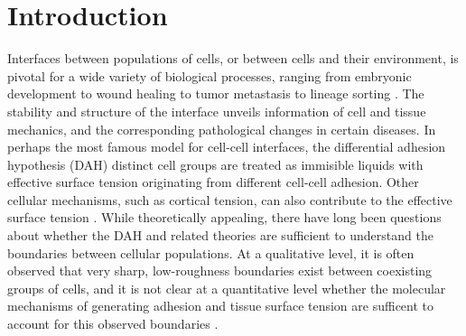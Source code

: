 \documentclass[twoside,twocolumn,9pt]{article}
\begin{document}




\section{Introduction}
Interfaces between populations of cells, or between cells and their environment, is pivotal for a wide variety of biological processes, ranging from embryonic development to wound healing to  tumor metastasis to lineage sorting \cite{dahmann2011boundary, yang2020leader, pawlizak2015testing,yanagida2022cell}. The stability and structure of the interface unveils information of cell and tissue mechanics, and the corresponding pathological changes in certain diseases. In perhaps the most famous model for cell-cell interfaces, the differential adhesion hypothesis (DAH) \cite{steinberg1962mechanism, steinberg2007differential}distinct cell groups are treated as immisible liquids with effective surface tension originating from different cell-cell adhesion. Other cellular mechanisms, such as cortical tension, can also contribute to the effective surface tension \cite{amack2012knowing,manning2010coaction,youssef2011quantification,krieg2008tensile,brodland2002differential}. While theoretically appealing, there have long been questions about whether the DAH and related theories are sufficient to understand the boundaries between cellular populations\cite{pawlizak2015testing,wiseman1977can,ninomiya2012cadherin,monier2010actomyosin}. At a qualitative level, it is often observed that very sharp, low-roughness boundaries exist between coexisting groups of cells, and it is not clear at a quantitative level whether the molecular mechanisms of generating adhesion and tissue surface tension are sufficent to account for this observed boundaries \cite{amack2012knowing}.
\end{document}
